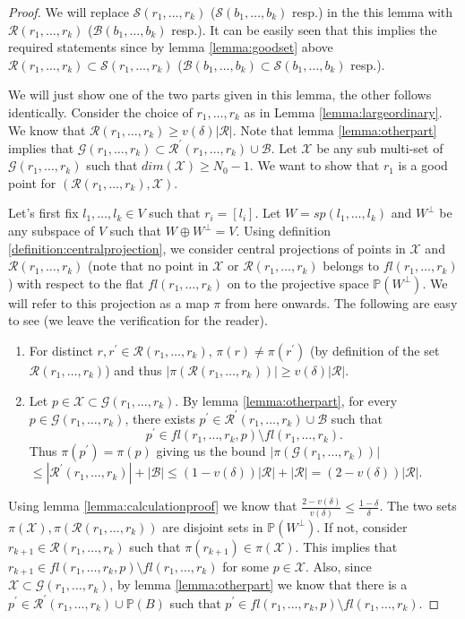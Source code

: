 \documentclass[12pt]{caltech_thesis}
\theoremstyle{plain}
\theoremstyle{definition}
\newcommand{\MS}{\mathcal{S}}
\newcommand{\MB}{\mathcal{B}}
\newcommand{\MR}{\mathcal{R}}
\newcommand{\MG}{\mathcal{G}}
\newcommand{\MX}{\mathcal{X}}
\newcommand{\PP}{\mathbb{P}}
\begin{document}
\begin{proof}
 We will replace $\MS(r_1,\ldots,r_k)$ ($\MS(b_1,\ldots,b_k)$ resp.) 
 in the this lemma with $\MR(r_1,\ldots,r_k)$ ($\MB(b_1,\ldots,b_k)$ resp.). It can be easily seen that this implies the required 
 statements since by lemma \ref{lemma:goodset} above $\MR(r_1,\ldots,r_k)\subset \MS(r_1,\ldots,r_k)$ ($\MB(b_1,\ldots,b_k)\subset \MS(b_1,\ldots,b_k)$ resp.).

 We will just show one of the two parts given in this lemma, the other follows identically. 
Consider the choice of $r_1,\ldots,r_k$ as in Lemma 
\ref{lemma:largeordinary}. We know that $\MR(r_1,\ldots,r_k) \geq v(\delta)|\MR|$. Note that 
lemma \ref{lemma:otherpart} implies that $\MG(r_1,\ldots,r_k)\subset \MR^\prime(r_1,\ldots,r_k)\cup \MB$. Let $\MX$
be any sub multi-set of $\MG(r_1,\ldots,r_k)$ such that $dim(\MX)\geq N_0-1$. We want to show that $r_1$ is a good point for $(\MR(r_1,\ldots,r_k),\MX)$.

Let's first fix $l_1,\ldots,l_k \in V$ such that $r_i = [l_i]$. Let $W = sp(l_1,\ldots,l_k)$ and $W^\perp$ be any subspace of $V$ such that
$W\oplus W^\perp = V$. Using definition \ref{definition:centralprojection}, we consider central projections of points in 
$\MX$ and $\MR(r_1,\ldots,r_k)$ (note that no point in $\MX$ or $\MR(r_1,\ldots,r_k)$ belongs to $fl(r_1,\ldots,r_k)$) with respect to the flat
$fl(r_1,\ldots,r_k)$ on to the projective space $\PP(W^\perp)$. 
We will refer to this projection as a map $\pi$ from here onwards. The following are easy to see (we leave the verification for the 
reader).
\begin{enumerate}
 \item For distinct $r,r^\prime \in \MR(r_1,\ldots,r_k)$, $\pi(r)\neq \pi(r^\prime)$ (by definition of the set $\MR(r_1,\ldots,r_k)$) and thus 
 $|\pi(\MR(r_1,\ldots,r_k))|\geq v(\delta)|\MR|$.
 \item Let  $p\in \MX \subset \MG(r_1,\ldots,r_k)$. 
 By lemma \ref{lemma:otherpart}, for every  $p\in \MG(r_1,\ldots,r_k)$, there exists $p^\prime \in\MR^\prime(r_1,\ldots,r_k)\cup \MB$ such that
 \[
  p^\prime \in fl(r_1,\ldots,r_k,p)\setminus fl(r_1,\ldots,r_k). 
 \]
Thus $\pi(p^\prime) = \pi(p)$ giving us the bound
$|\pi(\MG(r_1,\ldots,r_k))|$  $\leq |\MR^\prime(r_1,\ldots,r_k)| + |\MB| \leq (1-v(\delta))|\MR| + |\MR| = (2-v(\delta))|\MR|$.
\end{enumerate}

 
Using lemma \ref{lemma:calculationproof} we know that $\frac{2-v(\delta)}{v(\delta)} \leq \frac{1-\delta}{\delta}$.
The two sets $\pi(\MX), \pi(\MR(r_1,\ldots,r_k))$ are disjoint sets in $\PP(W^\perp)$. If not, consider $r_{k+1}\in \MR(r_1,\ldots,r_k)$ 
such that $\pi(r_{k+1}) \in \pi(\MX)$. This implies that $r_{k+1}\in fl(r_1,\ldots,r_k,p)\setminus fl(r_1,\ldots,r_k)$ for some $p\in \MX$. 
Also, since $\MX\subset \MG(r_1,\ldots,r_k)$, by lemma \ref{lemma:otherpart} we know that
there is a $p^\prime \in \MR^\prime(r_1,\ldots,r_k)\cup \PP(B)$ such that $p^\prime \in fl(r_1,\ldots,r_k,p)\setminus fl(r_1,\ldots,r_k)$.


\end{proof}
\end{document}
